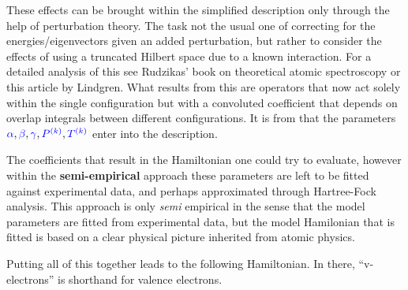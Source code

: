 \documentclass{article}
\begin{document}
These effects can be brought within the simplified description only through the help of perturbation theory. The task not the usual one of correcting for the energies/eigenvectors given an added perturbation, but rather to consider the effects of using a truncated Hilbert space due to a known interaction. For a detailed analysis of this see Rudzikas' \cite{rudzikas_theoretical_2007} book on theoretical atomic spectroscopy or this article \cite{lindgren_rayleigh-schrodinger_1974} by Lindgren. What results from this are operators that now act solely within the single configuration but with a convoluted coefficient that depends on overlap integrals between different configurations. It is from \confint that the parameters $\textcolor{blue}{{\alpha}}, \textcolor{blue}{{\beta}}, \textcolor{blue}{{\gamma}}, \textcolor{blue}{P^{(k)}}, \textcolor{blue}{T^{(k)}}$ enter into the description.

The coefficients that result in the Hamiltonian one could try to evaluate, however within the \textbf{semi-empirical} approach these parameters are left to be fitted against experimental data, and perhaps approximated through Hartree-Fock analysis. This approach is only \textit{semi} empirical in the sense that the model parameters are fitted from experimental data, but the model Hamilonian that is fitted is based on a clear physical picture inherited from atomic physics.

Putting all of this together leads to the following Hamiltonian. In there, ``v-electrons'' is shorthand for valence electrons.
\end{document}
